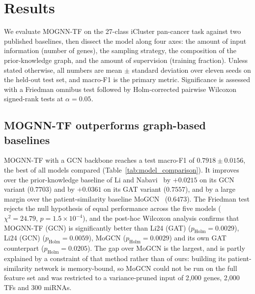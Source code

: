 \documentclass[review,3p,times,11pt, ]{elsarticle} %
\begin{document}
\section{Results}
\label{sec:results}

We evaluate MOGNN-TF on the 27-class iCluster pan-cancer task against
two published baselines, then dissect the model along four axes: the
amount of input information (number of genes), the sampling strategy,
the composition of the prior-knowledge graph, and the amount of
supervision (training fraction). Unless stated otherwise, all numbers
are mean $\pm$ standard deviation over eleven seeds on the held-out
test set, and macro-F1 is the primary metric. Significance is assessed
with a Friedman omnibus test followed by Holm-corrected pairwise
Wilcoxon signed-rank tests at $\alpha = 0.05$.

\subsection{MOGNN-TF outperforms graph-based baselines}
\label{ssec:res_baseline}

MOGNN-TF with a GCN backbone reaches a test macro-F1 of
$0.7918 \pm 0.0156$, the best of all models compared
(Table~\ref{tab:model_comparison}). It improves over the prior-knowledge
baseline of Li and Nabavi~\cite{li_multimodal_2024} by $+0.0215$ on its
GCN variant ($0.7703$) and by $+0.0361$ on its GAT variant ($0.7557$),
and by a large margin over the patient-similarity baseline
MoGCN~\cite{li_mogcn_2022} ($0.6473$). The Friedman test rejects the
null hypothesis of equal performance across the five models
($\chi^2 = 24.79$, $p = 1.5\times10^{-4}$), and the post-hoc Wilcoxon
analysis confirms that MOGNN-TF (GCN) is significantly better than
Li24 (GAT) ($p_{\text{Holm}} = 0.0029$), Li24 (GCN)
($p_{\text{Holm}} = 0.0059$), MoGCN ($p_{\text{Holm}} = 0.0029$) and
its own GAT counterpart ($p_{\text{Holm}} = 0.0205$). The gap over
MoGCN is the largest, and is partly explained by a constraint of that
method rather than of ours: building its patient-similarity network is
memory-bound, so MoGCN could not be run on the full feature set and was
restricted to a variance-pruned input of 2{,}000 genes, 2{,}000 TFs
and 300 miRNAs.
\end{document}
